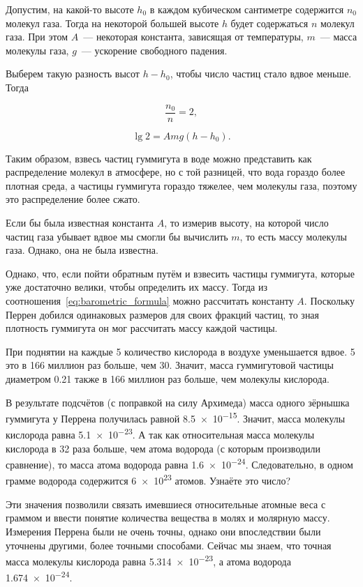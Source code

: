 Допустим, на какой-то высоте $h_0$ в каждом кубическом сантиметре содержится $n_0$ молекул газа. Тогда на некоторой большей высоте $h$ будет содержаться $n$ молекул газа. При этом $A$~--- некоторая константа, зависящая от температуры, $m$~--- масса молекулы газа, $g$~--- ускорение свободного падения.

Выберем такую разность высот $h - h_0$, чтобы число частиц стало вдвое меньше. Тогда

\begin{equation*}
    \frac{n_0}{n} = 2,
\end{equation*}

\begin{equation*}
    \lg 2 = Amg(h - h_0).
\end{equation*}

Таким образом, взвесь частиц гуммигута в воде можно представить как распределение молекул в атмосфере, но с той разницей, что вода гораздо более плотная среда, а частицы гуммигута гораздо тяжелее, чем молекулы газа, поэтому это распределение более сжато.

Если бы была известная константа $A$, то измерив высоту, на которой число частиц газа убывает вдвое мы смогли бы вычислить $m$, то есть массу молекулы газа. Однако, она не была известна.

Однако, что, если пойти обратным путём и взвесить частицы гуммигута, которые уже достаточно велики, чтобы определить их массу. Тогда из соотношения~\eqref{eq:barometric_formula} можно рассчитать константу $A$. Поскольку Перрен добился одинаковых размеров для своих фракций частиц, то зная плотность гуммигута он мог рассчитать массу каждой частицы.

При поднятии на каждые \qty{5}{\ruKm} количество кислорода в воздухе уменьшается вдвое. \qty{5}{\ruKm} это в 166 миллион раз больше, чем \qty{30}{\ruUm}. Значит, масса гуммигутовой частицы диаметром \qty{0,21}{\ruUm} также в 166 миллион раз больше, чем молекулы кислорода.

В результате подсчётов (с поправкой на силу Архимеда) масса одного зёрнышка гуммигута у Перрена получилась равной \qty{8,5e-15}{\ruG}. Значит, масса молекулы кислорода равна \qty{5,1e-23}{\ruG}. А так как относительная масса молекулы кислорода в 32 раза больше, чем атома водорода (с которым производили сравнение), то масса атома водорода равна \qty{1,6e-24}{\ruG}. Следовательно, в одном грамме водорода содержится \num{6e23} атомов. Узнаёте это число?

Эти значения позволили связать имевшиеся относительные атомные веса с граммом и ввести понятие количества вещества в молях и молярную массу. Измерения Перрена были не очень точны, однако они впоследствии были уточнены другими, более точными способами. Сейчас мы знаем, что точная масса молекулы кислорода равна \qty{5,314e-23}{\ruG}, а атома водорода \qty{1,674e-24}{\ruG}.

